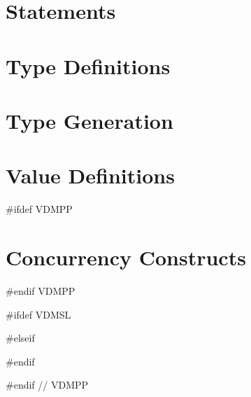 \documentclass[a4paper,dvips]{article}
\begin{document}
\section{Statements}


\section{Type Definitions}
\label{TD}


\section{Type Generation}\label{TPGEN}



\section{Value Definitions}


#ifdef VDMPP
\section{Concurrency Constructs}


#endif VDMPP

\appendix

%

%

#ifdef VDMSL

#elseif

#endif









#endif // VDMPP





\newpage
{}
\printindex
\end{document}

